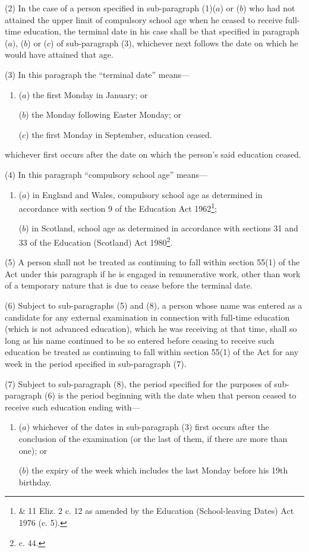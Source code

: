 \documentclass[a4paper,12pt]{article}
\begin{document}
(2) In the case of a person specified in sub-paragraph (1)($a$) or ($b$) who had not attained the upper limit of compulsory school age when he ceased to receive full-time education, the terminal date in his case shall be that specified in paragraph ($a$), ($b$) or ($c$) of sub-paragraph (3), whichever next follows the date on which he would have attained that age.

(3) In this paragraph the “terminal date” means—
\begin{enumerate}\item[]
($a$) the first Monday in January; or

($b$) the Monday following Easter Monday; or

($c$) the first Monday in September, education ceased.
\end{enumerate}
whichever first occurs after the date on which the person’s said education ceased.

(4) In this paragraph “compulsory school age” means—
\begin{enumerate}\item[]
($a$) in England and Wales, compulsory school age as determined in accordance with section 9 of the Education Act 1962\footnote{ \& 11 Eliz. 2 c. 12 as amended by the Education (School-leaving Dates) Act 1976 (c. 5).};

($b$) in Scotland, school age as determined in accordance with sections 31 and 33 of the Education (Scotland) Act 1980\footnote{ c. 44.}.
\end{enumerate}

(5) A person shall not be treated as continuing to fall within section 55(1) of the Act under this paragraph if he is engaged in remunerative work, other than work of a temporary nature that is due to cease before the terminal date.

(6) Subject to sub-paragraphs (5) and (8), a person whose name was entered as a candidate for any external examination in connection with full-time education (which is not advanced education), which he was receiving at that time, shall so long as his name continued to be so entered before ceasing to receive such education be treated as continuing to fall within section 55(1) of the Act for any week in the period specified in sub-paragraph (7).

(7) Subject to sub-paragraph (8), the period specified for the purposes of sub-paragraph (6) is the period beginning with the date when that person ceased to receive such education ending with—
\begin{enumerate}\item[]
($a$) whichever of the dates in sub-paragraph (3) first occurs after the conclusion of the examination (or the last of them, if there are more than one); or

($b$) the expiry of the week which includes the last Monday before his 19th birthday.
\end{enumerate}
\end{document}
